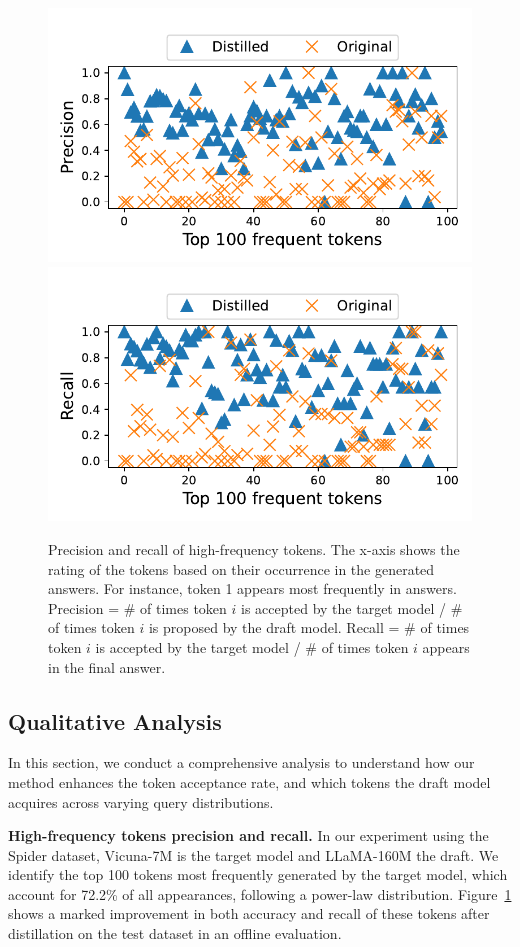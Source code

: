 \begin{figure} 
    \vspace{-10pt}
    \centering
    \includegraphics[width=0.4\linewidth]{figures/precision.pdf}
    \includegraphics[width=0.4\linewidth]{figures/recall.pdf}
    \vspace{-10pt}
    \caption{Precision and recall of high-frequency tokens. The x-axis shows the rating of the tokens based on their occurrence in the generated answers. For instance, token 1 appears most frequently in answers. Precision = \#  of times token $i$ is accepted by the target model / \# of times token $i$ is proposed by the draft model. Recall = \# of times token $i$ is accepted by the target model / \# of times token $i$ appears in the final answer.}
    \label{fig:freq-acc}
    \vspace{-10pt}
\end{figure}


\subsection{Qualitative Analysis}
In this section, we conduct a comprehensive analysis to understand how our method enhances the token acceptance rate, and which tokens the draft model acquires across varying query distributions.

{\bf High-frequency tokens precision and recall.} In our experiment using the Spider dataset, Vicuna-7M is the target model and LLaMA-160M the draft. 
We identify the top 100 tokens most frequently generated by the target model, which account for 72.2\% of all appearances, 
following a power-law distribution. Figure~\ref{fig:freq-acc} shows a marked improvement in both accuracy and recall
of these tokens after distillation on the test dataset in an offline evaluation. 



